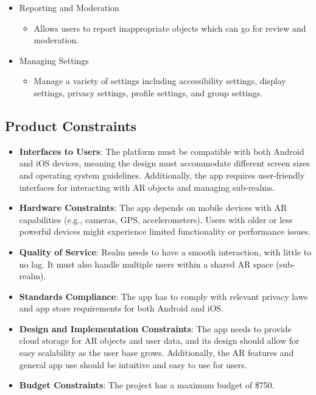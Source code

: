\documentclass{article}
\begin{document}
\begin{itemize}
    \item Reporting and Moderation
          \begin{itemize}
              \item Allows users to report inappropriate objects which can go for review and moderation.
          \end{itemize}

    \item Managing Settings
          \begin{itemize}
              \item Manage a variety of settings including accessibility settings, display settings, privacy settings, profile settings, and group settings.
          \end{itemize}
\end{itemize}
\subsection{Product Constraints}

\begin{itemize}
    \item \textbf{Interfaces to Users}: The platform must be compatible with both Android and iOS devices, meaning the design must accommodate different screen sizes and operating system guidelines. Additionally, the app requires user-friendly interfaces for interacting with AR objects and managing sub-realms.

    \item \textbf{Hardware Constraints}: The app depends on mobile devices with AR capabilities (e.g., cameras, GPS, accelerometers). Users with older or less powerful devices might experience limited functionality or performance issues.

    \item \textbf{Quality of Service}: Realm needs to have a smooth interaction, with little to no lag. It must also handle multiple users within a shared AR space (sub-realm).

    \item \textbf{Standards Compliance}: The app has to comply with relevant privacy laws and app store requirements for both Android and iOS.

    \item \textbf{Design and Implementation Constraints}: The app needs to provide cloud storage for AR objects and user data, and its design should allow for easy scalability as the user base grows. Additionally, the AR features and general app use should be intuitive and easy to use for users.

    \item \textbf{Budget Constraints}: The project has a maximum budget of \$750.
\end{itemize}
\end{document}
